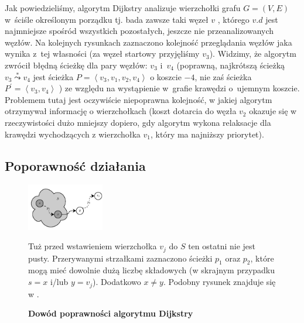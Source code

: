 Jak powiedzieliśmy, algorytm Dijkstry analizuje wierzchołki grafu $G = \left( V, E \right)$ w~ściśle określonym porządku tj. bada zawsze taki węzeł $v$ , którego $v.d$ jest najmniejsze spośród wszystkich pozostałych, jeszcze nie przeanalizowanych węzłów. Na kolejnych rysunkach zaznaczono kolejność przeglądania węzłów jaka wynika z~tej własności (za węzeł startowy przyjęliśmy $v_{3}$). Widzimy, że algorytm zwrócił błędną ścieżkę dla pary węzłów: $v_{3}$ i~$v_{4}$ (poprawną, najkrótszą ścieżką $v_{3} \overset{*}\leadsto v_{4}$ jest ścieżka $ P = \left \langle v_{3}, v_{1}, v_{2}, v_{4} \right \rangle $ o koszcie $-4$, nie zaś ścieżka $ P^{'} = \left \langle v_{3}, v_{4} \right \rangle $ ) ze względu na wystąpienie w~grafie krawędzi o~ujemnym koszcie. Problemem tutaj jest oczywiście niepoprawna kolejność, w jakiej algorytm otrzymywał informację o wierzchołkach (koszt dotarcia do węzła $v_{2}$ okazuje się w rzeczywistości dużo mniejszy dopiero, gdy algorytm wykona relaksacje dla krawędzi wychodzących z wierzchołka $v_{1}$, który ma najniższy priorytet).
\newpage

\subsection{Poporawność działania}

\begin{figure}[!htbp]
	\includegraphics[width=0.3\textwidth]{Chapter_II/ProofOfDijkstra/a.pdf}
	\caption{\textbf{Dowód poprawności algorytmu Dijkstry}} Tuż przed wstawieniem wierzchołka $v_{j}$ do $S$ ten ostatni nie jest pusty. Przerywanymi strzałkami zaznaczono ścieżki $p_{1}$ oraz $p_{2}$, które mogą mieć dowolnie dużą liczbę składowych (w skrajnym przypadku $s = x$ i/lub $y = v_{j}$). Dodatkowo $x \neq y$. Podobny rysunek znajduje się w \cite[$674$]{Cormen}. \label{fig:proofOfDijkstra}
\end{figure}

